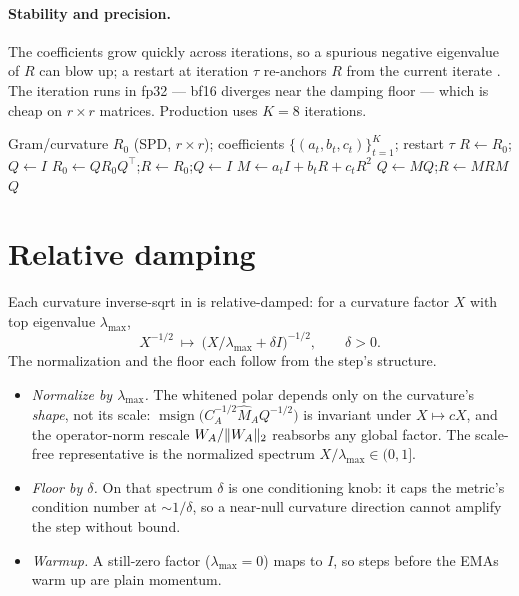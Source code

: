 \documentclass[11pt]{article}
\DeclarePairedDelimiter{\norm}{\lVert}{\rVert}
\DeclareMathOperator{\polar}{msign}          %
\theoremstyle{plain}
\theoremstyle{definition}
\theoremstyle{remark}
\begin{document}
\paragraph{Stability and precision.} The coefficients grow quickly across iterations,
so a spurious negative eigenvalue of $R$ can blow up; a restart at iteration $\tau$
re-anchors $R$ from the current iterate \cite{gram_ns}. The iteration runs in fp32 ---
bf16 diverges near the damping floor --- which is cheap on $r\times r$ matrices.
Production uses $K{=}8$ iterations.

\begin{algorithm}[h]
\caption{Gram Newton--Schulz (shared by $\polar$ and the inverse-sqrt)}
\label{alg:gramns}
\begin{algorithmic}[1]
\Require Gram/curvature $R_0$ (SPD, $r\times r$); coefficients $\{(a_t,b_t,c_t)\}_{t=1}^{K}$; restart $\tau$
\State $R\gets R_0$;\quad $Q\gets I$
   \State $R_0\gets Q R_0 Q^\top$;\quad $R\gets R_0$;\quad $Q\gets I$  \EndIf
  \State $M\gets a_t I+b_t R+c_t R^2$
  \State $Q\gets M Q$;\quad $R\gets M R M$
\EndFor
\State \Return $Q$ 
\end{algorithmic}
\end{algorithm}

\section{Relative damping}
\label{app:damping}
Each curvature inverse-sqrt in  is relative-damped: for a curvature factor $X$ with top eigenvalue $\lambda_{\max}$,
\begin{equation*}
  X^{-1/2}\ \longmapsto\ \big(X/\lambda_{\max}+\delta I\big)^{-1/2},\qquad \delta>0 .
\end{equation*}
The normalization and the floor each follow from the step's structure.
\begin{itemize}[leftmargin=1.5em,itemsep=2pt,topsep=2pt]
  \item \emph{Normalize by $\lambda_{\max}$.} The whitened polar depends only on the curvature's \emph{shape}, not its scale: $\polar\!\big(C_A^{-1/2}\hat M_A Q^{-1/2}\big)$ is invariant under $X\mapsto cX$, and the operator-norm rescale $W_A/\norm{W_A}_2$ reabsorbs any global factor. The scale-free representative is the normalized spectrum $X/\lambda_{\max}\in(0,1]$.
  \item \emph{Floor by $\delta$.} On that spectrum $\delta$ is one conditioning knob: it caps the metric's condition number at ${\sim}1/\delta$, so a near-null curvature direction cannot amplify the step without bound.
  \item \emph{Warmup.} A still-zero factor ($\lambda_{\max}=0$) maps to $I$, so steps before the EMAs warm up are plain momentum.
\end{itemize}
\end{document}
